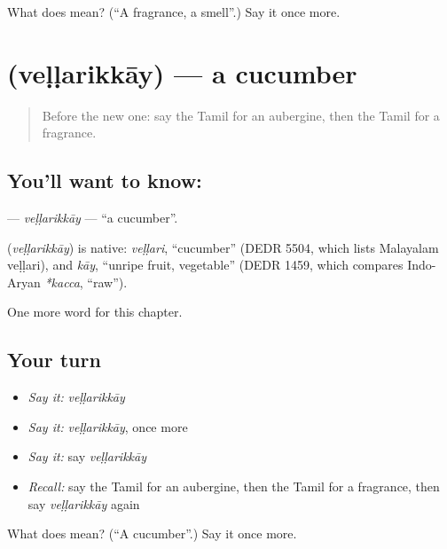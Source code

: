 \begin{tcolorbox}[breakable,colback=teal!4,colframe=teal!35!black,title={Before you move on}]
What does  mean? (\textquotedblleft{}A fragrance, a smell\textquotedblright{}.) Say it once more.
\end{tcolorbox}
\section[\texorpdfstring{\ta{வெள்ளரிக்காய்} (veḷḷarikkāy)}{வெள்ளரிக்காய் (veḷḷarikkāy)}]{ (veḷḷarikkāy) — a cucumber}

\label{lesson:TA-C243-vellarikkay}



\begin{quote}
Before the new one: say the Tamil for an aubergine, then the Tamil for a fragrance.
\end{quote}

\subsection*{You'll want to know: }
\textbf{} — \emph{veḷḷarikkāy} — \textquotedblleft{}a cucumber\textquotedblright{}.

\begin{cousinweb}
\textbf{} (\emph{veḷḷarikkāy}) is native: \emph{veḷḷari}, \textquotedblleft{}cucumber\textquotedblright{} (DEDR 5504, which lists Malayalam veḷḷari), and \emph{kāy}, \textquotedblleft{}unripe fruit, vegetable\textquotedblright{} (DEDR 1459, which compares Indo-Aryan \emph{*kacca}, \textquotedblleft{}raw\textquotedblright{}).
\end{cousinweb}

\begin{grammarlens}[title={What you've built}]
One more word for this chapter.
\end{grammarlens}

\subsection*{Your turn}
\begin{itemize}
\raggedright
  \item \emph{Say it:} \emph{veḷḷarikkāy}
  \item \emph{Say it:} \emph{veḷḷarikkāy}, once more
  \item \emph{Say it:} say \emph{veḷḷarikkāy}
  \item \emph{Recall:} say the Tamil for an aubergine, then the Tamil for a fragrance, then say \emph{veḷḷarikkāy} again
\end{itemize}

\begin{tcolorbox}[breakable,colback=teal!4,colframe=teal!35!black,title={Before you move on}]
What does  mean? (\textquotedblleft{}A cucumber\textquotedblright{}.) Say it once more.
\end{tcolorbox}
